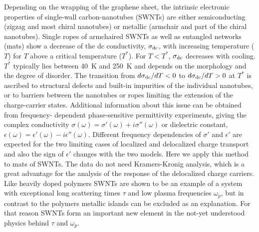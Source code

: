 \begin{multicols}{2}
\settowidth{\columnwidth}{aaaaaaaaaaaaaaaaaaaaaaaaaaaaaaaaaaaaaaaaaaaaaaaaaa}

Depending on the wrapping of the graphene sheet, the intrinsic
electronic properties of single-wall carbon-nanotubes (SWNTs) are
either semiconducting (zigzag and most chiral nanotubes) or metallic
(armchair and part of the chiral nanotubes)\cite{Hamada92,Wildoer98}. Single
ropes of armchaired SWNTs as well as entangled networks (mats) show a
decrease of the dc conductivity, $\sigma_{\rm dc}$, with increasing
temperature ($T$) for $T$ above a critical temperature
($T^*$)\cite{Fischer97,Kane98,Kaiser98,Petit97}. For $T<T^*$,
$\sigma_{\rm dc}$ decreases with cooling. $T^*$ typically lies
between 40~K and 250~K and depends on the morphology and the degree
of disorder\cite{Kane98}. The transition from $d\sigma_{\rm dc}/dT
<0$ to $d\sigma_{\rm dc}/dT > 0$ at $T^*$ is ascribed to structural
defects and built-in impurities of the individual
nanotubes\cite{Fuhrer99,Lee97}, or to barriers between the nanotubes or
ropes limiting the extension of the charge-carrier states\cite{Kaiser98}.
Additional information about this issue can be obtained from frequency-
dependent phase-sensitive permittivity experiments, giving the complex
conductivity $\sigma(\omega)= \sigma'(\omega) + i\sigma''(\omega)$ or
dielectric constant, $\epsilon(\omega)=\epsilon'(\omega) -
i\epsilon''(\omega)$\cite{sigma}. Different frequency dependencies of
$\sigma'$ and $\epsilon'$ are expected for the two limiting cases of
localized and delocalized charge transport and also the sign of $\epsilon'$
changes with the two models. Here we apply this method to mats of SWNTs. The
data do not need Kramers-Kronig analysis, which is a great advantage for the
analysis of the response of the delocalized charge carriers\cite{Chapman99}.
Like heavily doped polymers SWNTs are shown to be an example of a system with
exceptional long scattering times $\tau$ and low plasma frequencies
$\omega_p$, but in contrast to the polymers metallic islands can be excluded
as an explanation. For that reason SWNTs form an important new element in
the not-yet understood physics behind $\tau$ and $\omega_p$.


\end{multicols}
